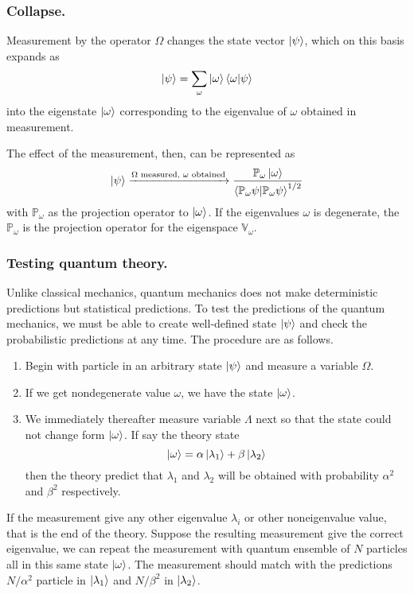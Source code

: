 \documentclass[../../../main.tex]{subfiles}
\begin{document}
\subsubsection{Collapse.}
Measurement by the operator $\Omega$ changes the state vector $\ket{\psi}$, which on this basis expands as 
\begin{equation*}
    \ket{\psi}=\sum_\omega \ket{\omega}\braket{\omega|\psi}
\end{equation*}
into the eigenstate $\ket{\omega}$ corresponding to the eigenvalue of $\omega$  obtained in measurement.

The effect of the measurement, then, can be represented as 
\begin{equation*}
    \ket{\psi}\xrightarrow{\Omega\text{ measured, }\omega\text{ obtained}}\frac{\mathbb{P}_\omega \ket{\omega }}{\braket{\mathbb{P}_\omega\psi|\mathbb{P }_\omega \psi}^{1/2}}
\end{equation*}
with $\mathbb{P }_\omega$ as the projection operator to $\ket{\omega}$. 
If the eigenvalues $\omega$ is degenerate, the $\mathbb{P }_\omega$ is the projection operator for the eigenspace $\mathbb{V}_\omega$. 

\subsubsection{Testing quantum theory.}
Unlike classical mechanics, quantum mechanics does not make deterministic predictions but statistical predictions.
To test the predictions of the quantum mechanics, we must be able to create well-defined state $\ket{\psi}$ and check the probabilistic predictions at any time.
The procedure are as follows.
\begin{enumerate}
    \item Begin with particle in an arbitrary state $\ket{\psi}$ and measure a variable $\Omega$.
    \item If we get nondegenerate value $\omega$, we have the state $\ket{\omega}$.
    \item We immediately thereafter measure variable $\Lambda$ next so that the state could not change form $\ket{\omega}$.
    If say the theory state 
    \begin{equation*}
        \ket{\omega}=\alpha \ket{\lambda_1}+\beta \ket{\lambda_2}
    \end{equation*}
    then the theory predict that $\lambda_1$ and $\lambda_2$ will be obtained with probability $\alpha^2$ and $\beta^2$ respectively.
\end{enumerate}
If the measurement give any other eigenvalue $\lambda_i$ or other noneigenvalue value, that is the end of the theory.
Suppose the resulting measurement give the correct eigenvalue, we can repeat the measurement with quantum ensemble of $N$ particles all in this same state $\ket{\omega}$.
The measurement should match with the predictions $N/\alpha^2$ particle in $\ket{\lambda_1}$ and $N/\beta^2$ in $\ket{\lambda_2}$.
\end{document}
